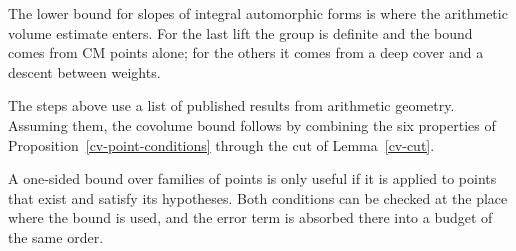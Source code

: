 The lower bound for slopes of integral automorphic forms is where the arithmetic volume
estimate enters. For the last lift the group is definite and the bound comes from CM
points alone; for the others it comes from a deep cover and a descent between weights.

The steps above use a list of published results from arithmetic geometry. Assuming them,
the covolume bound follows by combining the six properties of
Proposition~\ref{cv-point-conditions} through the cut of Lemma~\ref{cv-cut}.

A one-sided bound over families of points is only useful if it is applied to points that
exist and satisfy its hypotheses. Both conditions can be checked at the place where the
bound is used, and the error term is absorbed there into a budget of the same order.
